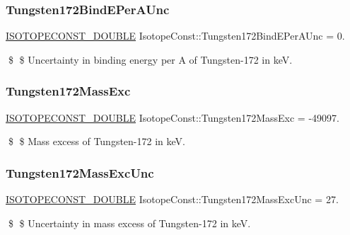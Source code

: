 \subsubsection{\texorpdfstring{Tungsten172\+Bind\+E\+Per\+A\+Unc}{Tungsten172BindEPerAUnc}}
{\footnotesize\ttfamily \mbox{\hyperlink{group___isotope_const-_macros_ga8f45a7272ce02c0b4c65c44636ed719a}{I\+S\+O\+T\+O\+P\+E\+C\+O\+N\+S\+T\+\_\+\+D\+O\+U\+B\+LE}} Isotope\+Const\+::\+Tungsten172\+Bind\+E\+Per\+A\+Unc = 0.}

\$ \$ Uncertainty in binding energy per A of Tungsten-\/172 in keV. \mbox{\label{group___isotope_const-_tungsten-_w172_ga119e5e8484eb2e086b7cf7e047cf161e}} 
\subsubsection{\texorpdfstring{Tungsten172\+Mass\+Exc}{Tungsten172MassExc}}
{\footnotesize\ttfamily \mbox{\hyperlink{group___isotope_const-_macros_ga8f45a7272ce02c0b4c65c44636ed719a}{I\+S\+O\+T\+O\+P\+E\+C\+O\+N\+S\+T\+\_\+\+D\+O\+U\+B\+LE}} Isotope\+Const\+::\+Tungsten172\+Mass\+Exc = -\/49097.}

\$ \$ Mass excess of Tungsten-\/172 in keV. \mbox{\label{group___isotope_const-_tungsten-_w172_ga743b76178b5aaeb01d5ca69def8b5c64}} 
\subsubsection{\texorpdfstring{Tungsten172\+Mass\+Exc\+Unc}{Tungsten172MassExcUnc}}
{\footnotesize\ttfamily \mbox{\hyperlink{group___isotope_const-_macros_ga8f45a7272ce02c0b4c65c44636ed719a}{I\+S\+O\+T\+O\+P\+E\+C\+O\+N\+S\+T\+\_\+\+D\+O\+U\+B\+LE}} Isotope\+Const\+::\+Tungsten172\+Mass\+Exc\+Unc = 27.}

\$ \$ Uncertainty in mass excess of Tungsten-\/172 in keV. \mbox{\label{group___isotope_const-_tungsten-_w172_ga3bc2f5f96eab3708e6c333ef33c0450b}} 
